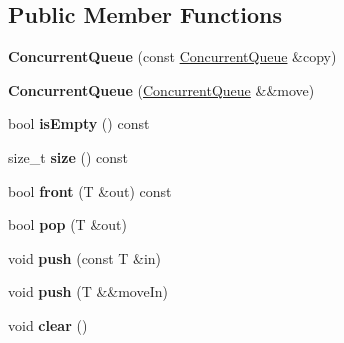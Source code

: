 \subsection*{Public Member Functions}
\begin{DoxyCompactItemize}
\item 
\hypertarget{class_d_x_1_1_lock_free_1_1_concurrent_queue_a489a668b3ead8e118342cd496b90fdc3}{{\bfseries Concurrent\-Queue} (const \hyperlink{class_d_x_1_1_lock_free_1_1_concurrent_queue}{Concurrent\-Queue} \&copy)}\label{class_d_x_1_1_lock_free_1_1_concurrent_queue_a489a668b3ead8e118342cd496b90fdc3}

\item 
\hypertarget{class_d_x_1_1_lock_free_1_1_concurrent_queue_a581d154f54650724c479edbcfcbd86ec}{{\bfseries Concurrent\-Queue} (\hyperlink{class_d_x_1_1_lock_free_1_1_concurrent_queue}{Concurrent\-Queue} \&\&move)}\label{class_d_x_1_1_lock_free_1_1_concurrent_queue_a581d154f54650724c479edbcfcbd86ec}

\item 
\hypertarget{class_d_x_1_1_lock_free_1_1_concurrent_queue_ad2091be06f9ff988e720e8dcf6892d26}{bool {\bfseries is\-Empty} () const }\label{class_d_x_1_1_lock_free_1_1_concurrent_queue_ad2091be06f9ff988e720e8dcf6892d26}

\item 
\hypertarget{class_d_x_1_1_lock_free_1_1_concurrent_queue_af41b589534d1513556ea179b5d2b1e84}{size\-\_\-t {\bfseries size} () const }\label{class_d_x_1_1_lock_free_1_1_concurrent_queue_af41b589534d1513556ea179b5d2b1e84}

\item 
\hypertarget{class_d_x_1_1_lock_free_1_1_concurrent_queue_a918c26bab246dbbaef94866f5c20fa3a}{bool {\bfseries front} (T \&out) const }\label{class_d_x_1_1_lock_free_1_1_concurrent_queue_a918c26bab246dbbaef94866f5c20fa3a}

\item 
\hypertarget{class_d_x_1_1_lock_free_1_1_concurrent_queue_ac9e79362ce3b1b30655ce1104ef3e39b}{bool {\bfseries pop} (T \&out)}\label{class_d_x_1_1_lock_free_1_1_concurrent_queue_ac9e79362ce3b1b30655ce1104ef3e39b}

\item 
\hypertarget{class_d_x_1_1_lock_free_1_1_concurrent_queue_a8612ba2519138505ea0dd158816194b9}{void {\bfseries push} (const T \&in)}\label{class_d_x_1_1_lock_free_1_1_concurrent_queue_a8612ba2519138505ea0dd158816194b9}

\item 
\hypertarget{class_d_x_1_1_lock_free_1_1_concurrent_queue_aaead004ad8fe7db381bff7c09c9f221c}{void {\bfseries push} (T \&\&move\-In)}\label{class_d_x_1_1_lock_free_1_1_concurrent_queue_aaead004ad8fe7db381bff7c09c9f221c}

\item 
\hypertarget{class_d_x_1_1_lock_free_1_1_concurrent_queue_a03b5624a1621065696ca49482bc59dce}{void {\bfseries clear} ()}\label{class_d_x_1_1_lock_free_1_1_concurrent_queue_a03b5624a1621065696ca49482bc59dce}

\end{DoxyCompactItemize}
